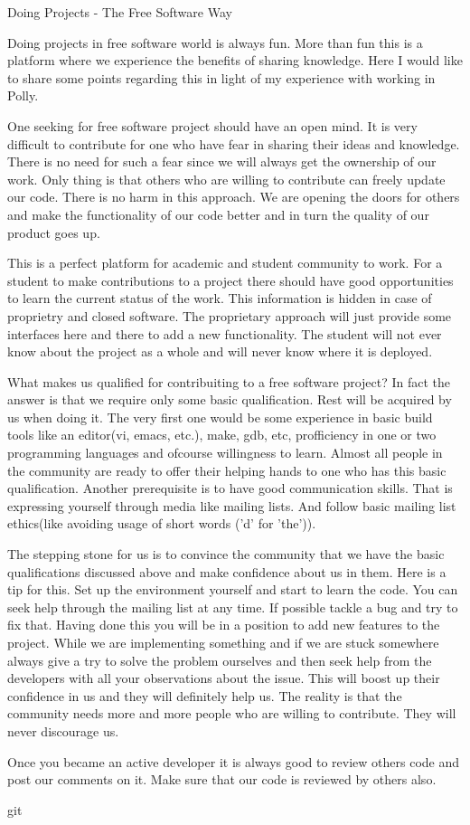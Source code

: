 Doing Projects - The Free Software Way

Doing projects in free software world is always fun. More than fun this is a platform where
we experience the benefits of sharing knowledge. Here I would like to share some points 
regarding this in light of my experience with working in Polly.

One seeking for free software project should have an open mind. It is very difficult to
contribute for one who have fear in sharing their ideas and knowledge. There is no need for
such a fear since we will always get the ownership of our work. Only thing is that
others who are willing to contribute can freely update our code. There is no harm in
this approach. We are opening the doors for others and make the functionality
of our code better and in turn the quality of our product goes up.

This is a perfect platform for academic and student community to work. For a student to
make contributions to a project there should have good opportunities to learn the
current status of the work. This information is hidden in case of proprietry and closed software.
The proprietary approach will just provide some interfaces here and there to add a
new functionality. The student will not ever know about the project as a whole and
will never know where it is deployed.

What makes us qualified for contribuiting to a free software project? In fact the answer is
that we require only some basic qualification. Rest will be acquired by us when doing it.
The very first one would be some experience in basic build tools like an editor(vi, emacs, etc.),
make, gdb, etc, profficiency in one or two programming languages and ofcourse willingness to learn.
Almost all people in the community are ready to offer their helping hands to one who has this
basic qualification. Another prerequisite is to have good communication skills. That is expressing
yourself through media like mailing lists. And follow basic mailing list ethics(like avoiding
usage of short words ('d' for 'the')). 

The stepping stone for us is to convince the community that we have the basic qualifications discussed
above and make confidence about us in them. Here is a tip for this. Set up the environment yourself
and start to learn the code. You can seek help through the
mailing list at any time. If possible tackle a bug and try to fix that. Having done this you will
be in a position to add new features to the project. While we are implementing something and if we
are stuck somewhere always give a try to solve the problem ourselves and then seek help from
the developers with all your observations about the issue. This will boost up their confidence
in us and they will definitely help us. The reality is that the community needs more and more
people who are willing to contribute. They will never discourage us.

Once you became an active developer it is always good to review others code and post our comments
on it. Make sure that our code is reviewed by others also.



git
